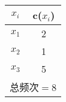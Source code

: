 \begin{tabular}{c|c}
	\multicolumn{1}{c|}{$x_i$} & c($x_i$) \\ \hline
	\multicolumn{1}{c|}{$x_1$} & 2        \\
	\multicolumn{1}{c|}{$x_2$} & 1        \\
	\multicolumn{1}{c|}{$x_3$} & 5        \\ \hline
	\multicolumn{2}{c}{总频次$=8$}         
\end{tabular}
